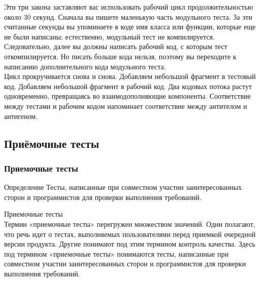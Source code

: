 \documentclass{../industrial-development}
\begin{document}
Эти три закона заставляют вас использовать рабочий цикл продолжительностью около 30 секунд. Сначала вы пишете маленькую часть модульного теста. За эти считанные секунды вы упоминаете в коде
имя класса или функции, которые еще не были написаны; естественно, модульный тест не компилируется. Следовательно, далее вы должны написать рабочий код, с которым тест откомпилируется. Но писать больше кода нельзя, поэтому вы переходите к написанию дополнительного кода модульного теста.\\
Цикл прокручивается снова и снова. Добавляем небольшой фрагмент в тестовый код. Добавляем небольшой фрагмент в рабочий код. Два кодовых потока растут одновременно, превращаясь во взаимодополняющие компоненты. Соответствие между тестами и рабочим кодом напоминает соответствие между антителом и антигеном.

\subsection{Приёмочные тесты}
\begin{frame} \frametitle{Приемочные тесты}
  \begin{block}{Определение}
	Тесты, написанные при совместном участии заинтересованных сторон и программистов для проверки выполнения требований.
  \end{block}
\end{frame}
\lecturenotes
Приемочные тесты\\
Термин «приемочные тесты» перегружен множеством значений. Одни полагают, что речь идет о тестах, выполняемых пользователями перед приемкой очередной версии продукта. Другие понимают под этим термином контроль качества. Здесь под термином «приемочные тесты» понимаются тесты, написанные при совместном участии заинтересованных сторон и программистов для проверки выполнения
требований.
\end{document}
